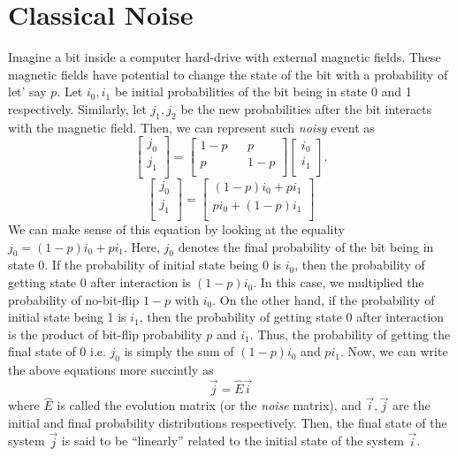 \documentclass{article}
\begin{document}
\section{Classical Noise}
Imagine a bit inside a computer hard-drive with external magnetic fields. These
magnetic fields have potential to change the state of the bit with a probability
of let' say \(p\). Let \(i_0, i_1\) be initial probabilities of the bit being
in state 0 and 1 respectively. Similarly, let \(j_1, j_2\) be the new probabilities
after the bit interacts with the magnetic field. Then, we can represent such
\textit{noisy} event as
\[
 \begin{bmatrix}
  j_0 \\
  j_1 \\
 \end{bmatrix}
 =
 \begin{bmatrix}
  1-p &  & p   \\
  p   &  & 1-p \\
 \end{bmatrix}
 \begin{bmatrix}
  i_0 \\
  i_1 \\
 \end{bmatrix}.
\]
\[\begin{bmatrix}
  j_0 \\
  j_1 \\
 \end{bmatrix}
 =
 \begin{bmatrix}
  (1-p)i_0 + pi_1 \\
  pi_0 + (1-p)i_1 \\
 \end{bmatrix}\]
We can make sense of this equation by looking at the equality \(j_0 = (1-p)i_0 + pi_1 \).
Here, \(j_0\) denotes the final probability of the bit being in state 0. If the probability of initial state being 0 is \(i_0\),
then the probability of getting state 0 after interaction is \((1-p)i_0\). In this case,
we multiplied the probability of no-bit-flip  \(1-p\) with \(i_0\). On the other hand, if the probability of initial state being 1
is \(i_1\), then the probability of getting state 0 after interaction is the product of
bit-flip probability \(p\) and \(i_1\). Thus, the probability of getting the final
state of 0 i.e. \(j_0\) is simply the sum of \((1-p)i_0\) and \(pi_1\).
Now, we can write the above equations more succintly as
\[\vec{j} = \hat{E}\vec{i}\]
where \(\hat{E}\) is called the evolution matrix (or the \textit{noise} matrix), and
\(\vec{i}, \vec{j}\) are the initial and final probability distributions respectively.
Then, the final state of the system \(\vec{j}\) is said to be ``linearly'' related to the
initial state of the system \(\vec{i}\).
\end{document}
